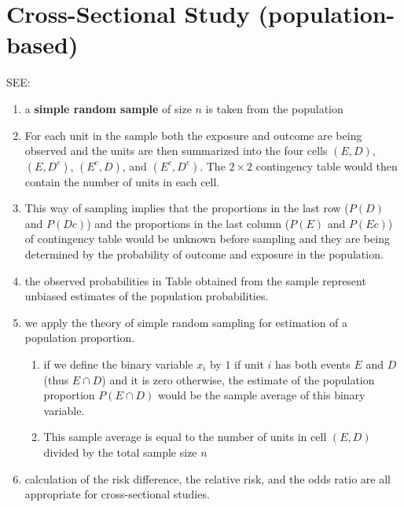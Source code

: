 \section{Cross-Sectional Study (population-based)}

SEE: 

\begin{enumerate}
    \item a \textbf{simple random sample} of size $n$ is taken from the population
    \hfill \cite{statistics/book/Statistics-for-Data-Scientists/Maurits-Kaptein}

    \item For each unit in the sample both the exposure and outcome are being observed and the units are then summarized into the four cells $(E, D)$, $(E, D^c)$, $(E^c, D)$, and $(E^c, D^c)$.
    The $2 \times 2$ contingency table would then contain the number of units in each cell.
    \hfill \cite{statistics/book/Statistics-for-Data-Scientists/Maurits-Kaptein}

    \item This way of sampling implies that the proportions in the last row ($P(D)$ and $P(Dc)$) and the proportions in the last column ($P(E)$ and $P(Ec)$) of contingency table would be unknown before sampling and they are being determined by the probability of outcome and exposure in the population.
    \hfill \cite{statistics/book/Statistics-for-Data-Scientists/Maurits-Kaptein}

    \item the observed probabilities in Table  obtained from the sample represent unbiased estimates of the population probabilities.
    \hfill \cite{statistics/book/Statistics-for-Data-Scientists/Maurits-Kaptein}

    \item we apply the theory of simple random sampling for estimation of a population proportion.
    \hfill \cite{statistics/book/Statistics-for-Data-Scientists/Maurits-Kaptein}
    \begin{enumerate}
        \item if we define the binary variable $x_i$ by $1$ if unit $i$ has both events $E$ and $D$ (thus $E \cap D$) and it is zero otherwise, the estimate of the population proportion $P(E \cap D)$ would be the sample average of this binary variable.

        \item This sample average is equal to the number of units in cell $(E, D)$ divided by the total sample size $n$
    \end{enumerate}
    \hfill \cite{statistics/book/Statistics-for-Data-Scientists/Maurits-Kaptein}

    \item calculation of the risk difference, the relative risk, and the odds ratio are all appropriate for cross-sectional studies.
    \hfill \cite{statistics/book/Statistics-for-Data-Scientists/Maurits-Kaptein}
\end{enumerate}















